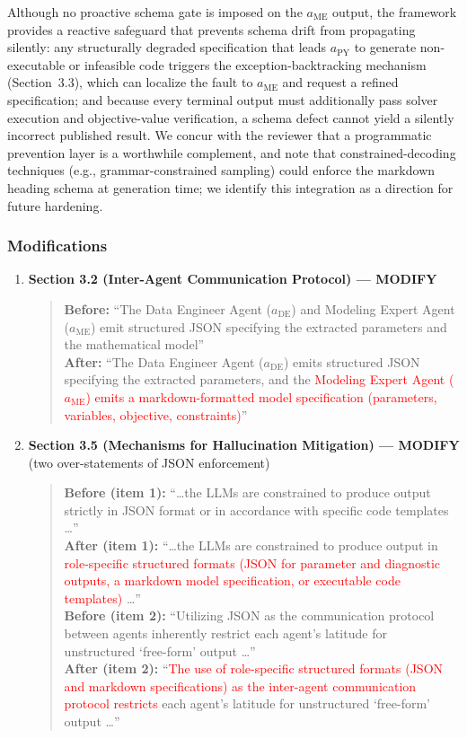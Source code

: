 \documentclass[11pt,a4paper]{article}
\begin{document}
Although no proactive schema gate is imposed on the $a_{\text{ME}}$ output, the framework provides a reactive safeguard that prevents schema drift from propagating silently: any structurally degraded specification that leads $a_{\text{PY}}$ to generate non-executable or infeasible code triggers the exception-backtracking mechanism (Section~3.3), which can localize the fault to $a_{\text{ME}}$ and request a refined specification; and because every terminal output must additionally pass solver execution and objective-value verification, a schema defect cannot yield a silently incorrect published result. We concur with the reviewer that a programmatic prevention layer is a worthwhile complement, and note that constrained-decoding techniques (e.g., grammar-constrained sampling) could enforce the markdown heading schema at generation time; we identify this integration as a direction for future hardening.

\subsubsection{Modifications}
\begin{enumerate}
\item \textbf{Section 3.2 (Inter-Agent Communication Protocol) --- MODIFY}
\begin{quote}
\textbf{Before:} ``The Data Engineer Agent ($a_{\text{DE}}$) and Modeling Expert Agent ($a_{\text{ME}}$) emit structured JSON specifying the extracted parameters and the mathematical model''\\[4pt]
\textbf{After:} ``The Data Engineer Agent ($a_{\text{DE}}$) emits structured JSON specifying the extracted parameters, and the \textcolor{red}{Modeling Expert Agent ($a_{\text{ME}}$) emits a markdown-formatted model specification (parameters, variables, objective, constraints)}''
\end{quote}

\item \textbf{Section 3.5 (Mechanisms for Hallucination Mitigation) --- MODIFY} (two over-statements of JSON enforcement)
\begin{quote}
\textbf{Before (item 1):} ``\ldots the LLMs are constrained to produce output strictly in JSON format or in accordance with specific code templates \ldots''\\[4pt]
\textbf{After (item 1):} ``\ldots the LLMs are constrained to produce output in \textcolor{red}{role-specific structured formats (JSON for parameter and diagnostic outputs, a markdown model specification, or executable code templates)} \ldots''\\[6pt]
\textbf{Before (item 2):} ``Utilizing JSON as the communication protocol between agents inherently restrict each agent's latitude for unstructured `free-form' output \ldots''\\[4pt]
\textbf{After (item 2):} ``\textcolor{red}{The use of role-specific structured formats (JSON and markdown specifications) as the inter-agent communication protocol restricts} each agent's latitude for unstructured `free-form' output \ldots''
\end{quote}
\end{enumerate}
\end{document}
